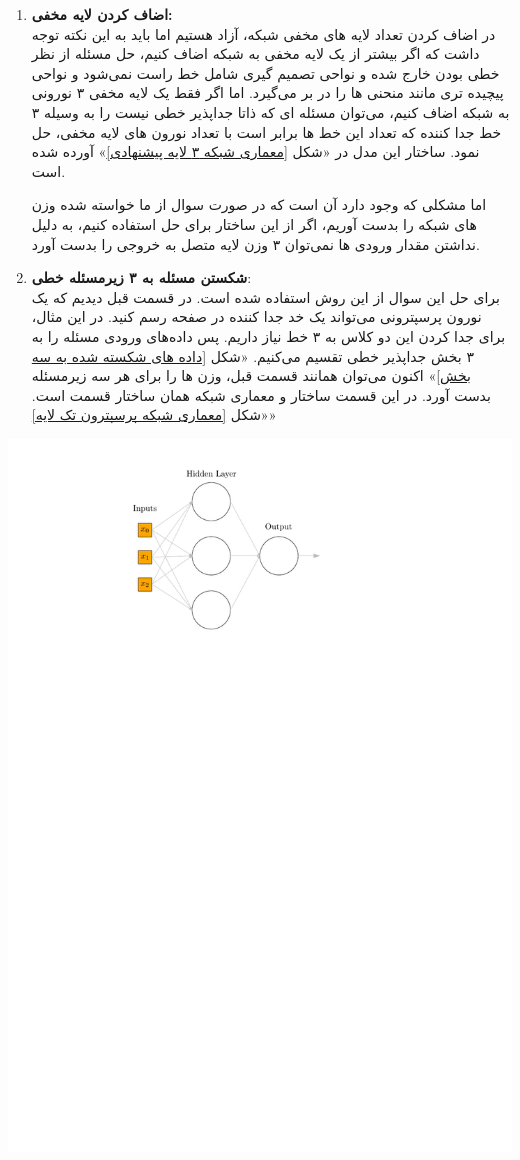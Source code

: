\begin{enumerate}
\begin{qsolve}
\begin{enumerate}
			\item \textbf{اضاف کردن لایه مخفی: }\\
			در اضاف کردن تعداد لایه های مخفی شبکه، آزاد هستیم اما باید به این نکته توجه داشت که اگر بیشتر از یک لایه مخفی به شبکه اضاف کنیم، حل مسئله از نظر خطی بودن خارج شده و نواحی تصمیم گیری شامل خط راست نمی‌شود و نواحی پیچیده تری مانند منحنی ها را در بر می‌گیرد. اما اگر فقط یک لایه مخفی ۳ نورونی به شبکه اضاف کنیم، می‌توان مسئله ای که ذاتا جدا‌پذیر خطی نیست را به وسیله ۳ خط جدا کننده که تعداد این خط ها برابر است با تعداد نورون های لایه مخفی، حل نمود. ساختار این مدل در «شکل \ref{معماری شبکه ۳ لایه پیشنهادی}» آورده شده است.
			
			اما مشکلی که وجود دارد آن است که در صورت سوال از ما خواسته شده وزن های شبکه را بدست آوریم، اگر از این ساختار برای حل استفاده کنیم، به دلیل نداشتن مقدار ورودی ها نمی‌توان ۳ وزن لایه متصل به خروجی را بدست آورد.
			
			\item \textbf{شکستن مسئله به ۳ زیرمسئله خطی}: \\
			برای حل این سوال از این روش استفاده شده است. در قسمت قبل دیدیم که یک نورون پرسپترونی می‌تواند یک خد جدا کننده در صفحه رسم کنید. در این مثال، برای جدا کردن این دو کلاس به ۳ خط نیاز داریم. پس داده‌های ورودی مسئله را به ۳ بخش جدا‌پذیر خطی تقسیم می‌کنیم. «شکل \ref{داده های شکسته شده به سه بخش}» اکنون می‌توان همانند قسمت قبل، وزن ها را برای هر سه زیر‌مسئله بدست آورد. در این قسمت ساختار و معماری شبکه همان ساختار قسمت  است. «شکل \ref{معماری شبکه پرسپترون تک لایه}»
			
			
		\end{enumerate}
	\end{qsolve}
	
	
	
	\begin{qsolve}
		\begin{center}
			\includegraphics*[width=0.5\linewidth]{pics/img3.pdf}
			\label{معماری شبکه ۳ لایه پیشنهادی}
		\end{center}
		

\end{qsolve}
\end{enumerate}
